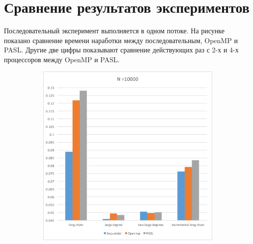 \documentclass[specification,annotation,times]{itmo-student-thesis}
\newcommand{\revise}[1]{{\color{red!70!black} #1 }}
\begin{document}
\section{Сравнение результатов экспериментов}

\revise{
Последовательный эксперимент выполняется в одном потоке. На рисунке показано сравнение времени наработки между последовательным, OpenMP и PASL. Другие две цифры показывают сравнение действующих раз с 2-х 
и 4-х процессоров между OpenMP и PASL.
}

\begin{figure}[!ht]
\centering
\begin{subfigure}[b]{0.45\textwidth}
    \includegraphics[width=\textwidth]{pic/results-1-a.png}
\end{subfigure}~~\begin{subfigure}[b]{0.45\textwidth}

\end{subfigure}
\end{figure}
\end{document}
